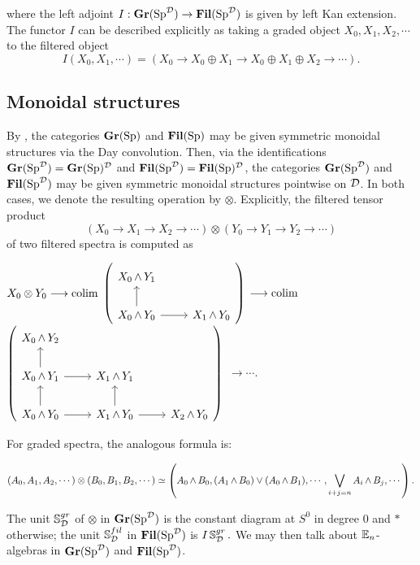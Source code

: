 where the left adjoint $I: \Gr(\Sp^{\D}) \to \Fil(\Sp^{\D})$ is given by left Kan extension.  The functor $I$ can be described explicitly as taking a graded object $X_0,X_1,X_2,\cdots$ to the filtered object $$I(X_0, X_1, \cdots) = (X_0\to X_0\oplus X_1\to X_0 \oplus X_1\oplus X_2\to \cdots).$$   


\subsection{Monoidal structures}\label{sect:monoidal}
By \cite[Corollary 2.3.9]{LurieRot}, the categories $\Gr(\Sp)$ and $\Fil(\Sp)$ may be given symmetric monoidal structures via the Day convolution.  Then, via the identifications $\Gr(\Sp^{\D}) = \Gr(\Sp)^{\D}$ and $\Fil(\Sp^{\D}) = \Fil(\Sp)^{\D}$, the categories $\Gr(\Sp^{\D})$ and $\Fil(\Sp^{\D})$ may be given symmetric monoidal structures pointwise on $\D$.  In both cases, we denote the resulting operation by $\otimes$.  Explicitly, the filtered tensor product $$\left(X_0 \longrightarrow X_1 \longrightarrow X_2 \longrightarrow \cdots \right) \otimes \left(Y_0 \longrightarrow Y_1 \longrightarrow Y_2 \longrightarrow \cdots \right)$$
of two filtered spectra is computed as

\begin{center}
$X_0 \otimes Y_0 \longrightarrow \colim $
{$ \left(\begin{tikzcd} X_0 \smsh Y_1 \\  X_0 \smsh Y_0 \arrow{u} \arrow{r} & X_1 \smsh Y_0 \end{tikzcd} \right) $} 
$\longrightarrow \colim$
 {$ \left( \begin{tikzcd} X_0 \smsh Y_2 \\ X_0 \smsh Y_1 \arrow{r} \arrow{u} & X_1 \smsh Y_1  \\ X_0 \smsh Y_0 \arrow{r} \arrow{u} & X_1 \smsh Y_0 \arrow{u} \arrow{r} & X_2 \smsh Y_0 \end{tikzcd} \right) $}
$\longrightarrow \cdots.$
\end{center}

For graded spectra, the analogous formula is:

$$(A_0,A_1,A_2,\cdots) \otimes (B_0,B_1,B_2,\cdots) \simeq \left( A_0 \smsh B_0, (A_1 \smsh B_0) \vee (A_0 \smsh B_1), \cdots, \bigvee_{i+j=n} A_i \smsh B_j, \cdots \right).$$





The unit $\S0^{gr}_{\D}$ of $\otimes$ in $\Gr(\Sp^{\D})$ is the constant diagram at $S^0$ in degree 0 and $*$ otherwise; the unit $\S0^{fil}_{\D}$ in $\Fil(\Sp^{\D})$ is $I\S0^{gr}_{\D}.$  We may then talk about $\E_n$-algebras in $\Gr(\Sp^{\D})$ and $\Fil(\Sp^{\D})$.  



